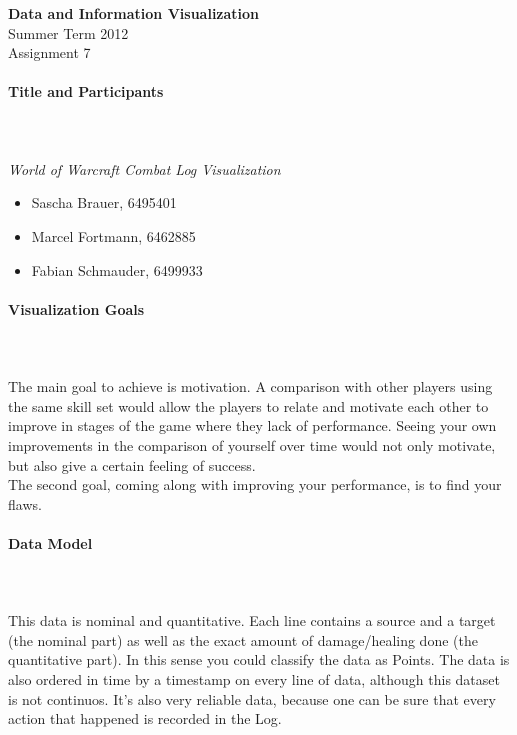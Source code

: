 \documentclass{scrartcl}
\begin{document}
\begin{center}
{\huge \textbf{Data and Information Visualization}}\\
Summer Term 2012\\
Assignment 7
\end{center}

\paragraph{Title and Participants}
\hfill \\ \hfill \\
\textit{World of Warcraft Combat Log Visualization}\\
\begin{itemize}
\item Sascha Brauer, 6495401
\item Marcel Fortmann, 6462885
\item Fabian Schmauder, 6499933
\end{itemize}

\paragraph{Visualization Goals}
\hfill \\ \hfill \\
The main goal to achieve is motivation. A comparison with other players using the same skill set would allow the players to relate and motivate each other to improve in stages of the game where they lack of performance. Seeing your own improvements in the comparison of yourself over time would not only motivate, but also give a certain feeling of success.\\
The second goal, coming along with improving your performance, is to find your flaws.

\paragraph{Data Model}
\hfill \\ \hfill \\
This data is nominal and quantitative. Each line contains a source and a target (the nominal part) as well as the exact amount of damage/healing done (the quantitative part). In this sense you could classify the data as Points. The data is also ordered in time by a timestamp on every line of data, although this dataset is not continuos. It's also very reliable data, because one can be sure that every action that happened is recorded in the Log. 
\end{document}
